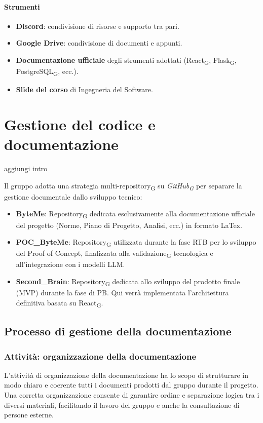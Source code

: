 \documentclass[11pt,a4paper]{article}
\newcommand{\gls}[1]{#1\textsubscript{G}}
\begin{document}
\paragraph{Strumenti}
\begin{itemize}
    \item \textbf{Discord}: condivisione di risorse e supporto tra pari.
    \item \textbf{Google Drive}: condivisione di documenti e appunti.
    \item \textbf{Documentazione ufficiale} degli strumenti adottati
    (\gls{React}, \gls{Flask}, \gls{PostgreSQL}, ecc.).
    \item \textbf{Slide del corso} di Ingegneria del Software.
\end{itemize}


\newpage

\section{Gestione del codice e documentazione}
aggiungi intro

Il gruppo adotta una strategia multi-\gls{repository} su \textit{\gls{GitHub}} per separare la gestione documentale dallo sviluppo tecnico:
\begin{itemize}
    \item \textbf{ByteMe}: \gls{Repository} dedicata esclusivamente alla documentazione ufficiale del progetto (Norme, Piano di Progetto, Analisi, ecc.) in formato LaTex.
    \item \textbf{POC\_ByteMe}: \gls{Repository} utilizzata durante la fase RTB per lo sviluppo del Proof of Concept, finalizzata alla \gls{validazione} tecnologica e all'integrazione con i modelli LLM.
    \item \textbf{Second\_Brain}: \gls{Repository} dedicata allo sviluppo del prodotto finale (MVP) durante la fase di PB. Qui verrà implementata l'architettura definitiva basata su \gls{React}.
\end{itemize}

\subsection{Processo di gestione della documentazione}

\subsubsection{Attività: organizzazione della documentazione}
L’attività di organizzazione della documentazione ha lo scopo di strutturare in modo chiaro e coerente tutti i documenti prodotti dal gruppo durante il progetto.
Una corretta organizzazione consente di garantire ordine e separazione logica tra i diversi materiali, facilitando il lavoro del gruppo e anche la consultazione di persone esterne.
\end{document}
